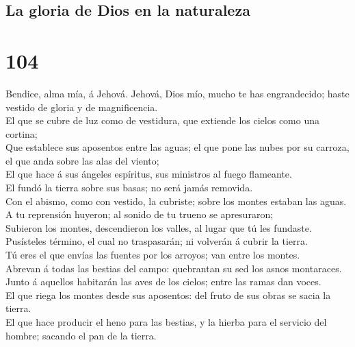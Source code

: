 \hypertarget{la-gloria-de-dios-en-la-naturaleza}{%
\subsection{La gloria de Dios en la
naturaleza}\label{la-gloria-de-dios-en-la-naturaleza}}

\hypertarget{section-19-104}{%
\section{104}\label{section-19-104}}

 Bendice, alma mía, á Jehová. Jehová, Dios mío, mucho te
has engrandecido; haste vestido de gloria y de magnificencia.\\
 El que se cubre de luz como de vestidura, que extiende
los cielos como una cortina;\\
 Que establece sus aposentos entre las aguas; el que pone
las nubes por su carroza, el que anda sobre las alas del viento;\\
 El que hace á sus ángeles espíritus, sus ministros al
fuego flameante.\\
 El fundó la tierra sobre sus basas; no será jamás
removida.\\
 Con el abismo, como con vestido, la cubriste; sobre los
montes estaban las aguas.\\
 A tu reprensión huyeron; al sonido de tu trueno se
apresuraron;\\
 Subieron los montes, descendieron los valles, al lugar
que tú les fundaste.\\
 Pusísteles término, el cual no traspasarán; ni volverán á
cubrir la tierra.\\
 Tú eres el que envías las fuentes por los arroyos; van
entre los montes.\\
 Abrevan á todas las bestias del campo: quebrantan su sed
los asnos montaraces.\\
 Junto á aquellos habitarán las aves de los cielos; entre
las ramas dan voces.\\
 El que riega los montes desde sus aposentos: del fruto
de sus obras se sacia la tierra.\\
 El que hace producir el heno para las bestias, y la
hierba para el servicio del hombre; sacando el pan de la tierra.\\
